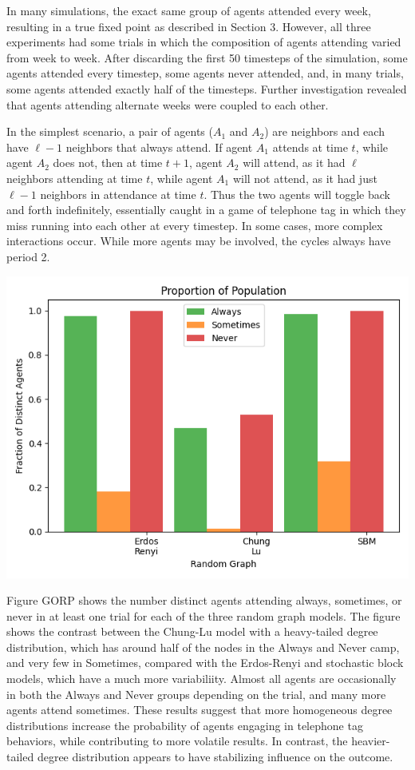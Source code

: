 \documentclass[12pt]{article}
\begin{document}
In many simulations, the exact same group of agents attended every week, resulting in a true fixed point as described in Section 3.  However, all three experiments had some trials in which the composition of agents attending varied from week to week.  After discarding the first 50 timesteps of the simulation, some agents attended every timestep, some agents never attended, and, in many trials, some agents attended exactly half of the timesteps.  Further investigation revealed that agents attending alternate weeks were coupled to each other.  

In the simplest scenario, a pair of agents ($A_1$ and $A_2$) are neighbors and each have $\ell - 1$ neighbors that always attend.  If agent $A_1$ attends at time $t$, while agent $A_2$ does not, then at time $t+1$, agent $A_2$ will attend, as it had $\ell$ neighbors attending at time $t$, while agent $A_1$ will not attend, as it had just $\ell - 1$ neighbors in attendance at time $t$.  Thus the two agents will toggle back and forth indefinitely, essentially caught in a game of telephone tag in which they miss running into each other at every timestep.  In some cases, more complex interactions occur.  While more agents may be involved, the cycles always have period 2.

\begin{center}
\includegraphics[scale=0.7]{always_sometimes_never.png}
\end{center}

Figure GORP shows the number distinct agents attending always, sometimes, or never in at least one trial for each of the three random graph models.  The figure shows the contrast between the Chung-Lu model with a heavy-tailed degree distribution, which has around half of the nodes in the Always and Never camp, and very few in Sometimes, compared with the Erdos-Renyi and stochastic block models, which have a much more variabiliity.  Almost all agents are occasionally in both the Always and Never groups depending on the trial, and many more agents attend sometimes.  These results suggest that more homogeneous degree distributions increase the probability of agents engaging in telephone tag behaviors, while contributing to more volatile results.  In contrast, the heavier-tailed degree distribution appears to have stabilizing influence on the outcome.
\end{document}
